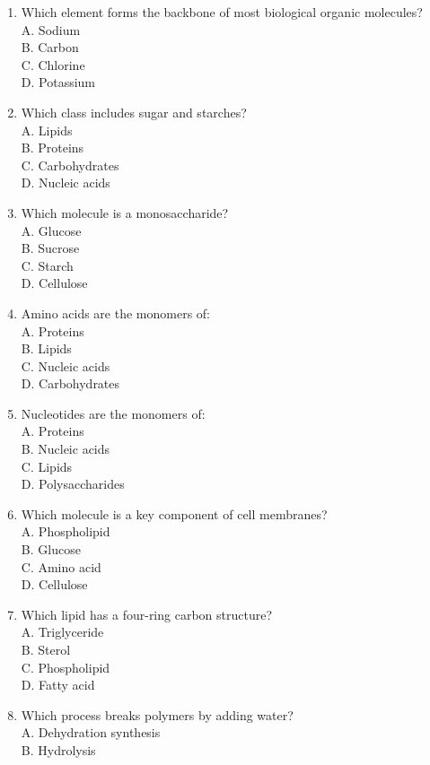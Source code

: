 \documentclass[
  letterpaper,
  DIV=11,
  numbers=noendperiod]{scrreprt}
\begin{document}
\begin{enumerate}
\def\labelenumi{\arabic{enumi}.}
\item
  Which element forms the backbone of most biological organic
  molecules?\\
  A. Sodium\\
  B. Carbon\\
  C. Chlorine\\
  D. Potassium
\item
  Which class includes sugar and starches?\\
  A. Lipids\\
  B. Proteins\\
  C. Carbohydrates\\
  D. Nucleic acids
\item
  Which molecule is a monosaccharide?\\
  A. Glucose\\
  B. Sucrose\\
  C. Starch\\
  D. Cellulose
\item
  Amino acids are the monomers of:\\
  A. Proteins\\
  B. Lipids\\
  C. Nucleic acids\\
  D. Carbohydrates
\item
  Nucleotides are the monomers of:\\
  A. Proteins\\
  B. Nucleic acids\\
  C. Lipids\\
  D. Polysaccharides
\item
  Which molecule is a key component of cell membranes?\\
  A. Phospholipid\\
  B. Glucose\\
  C. Amino acid\\
  D. Cellulose
\item
  Which lipid has a four-ring carbon structure?\\
  A. Triglyceride\\
  B. Sterol\\
  C. Phospholipid\\
  D. Fatty acid
\item
  Which process breaks polymers by adding water?\\
  A. Dehydration synthesis\\
  B. Hydrolysis\\

\end{enumerate}
\end{document}
